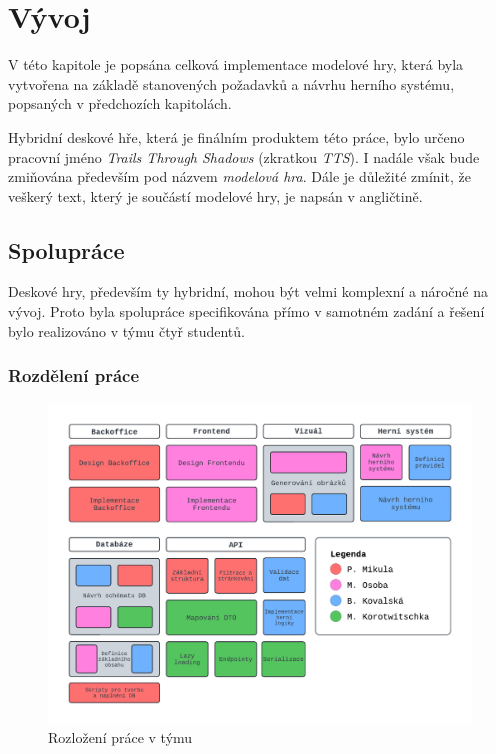 \chapter{Vývoj}
\label{chap:development}

V této kapitole je popsána celková implementace modelové hry, která byla vytvořena na základě stanovených požadavků a návrhu herního systému, popsaných v předchozích kapitolách.

Hybridní deskové hře, která je finálním produktem této práce, bylo určeno pracovní jméno \textit{Trails Through Shadows} (zkratkou \textit{TTS}). I nadále však bude zmiňována především pod názvem \textit{modelová hra}. Dále je důležité zmínit, že veškerý text, který je součástí modelové hry, je napsán v angličtině.

\section{Spolupráce}
\label{sec:collaboration}

Deskové hry, především ty hybridní, mohou být velmi komplexní a náročné na vývoj. Proto byla spolupráce specifikována přímo v samotném zadání a řešení bylo realizováno v týmu čtyř studentů.

\subsection{Rozdělení práce}
\label{subsec:job_distribution}

\begin{figure}[h]
    \centering
    \includegraphics[width=\textwidth]{../../shared/diagrams/blocks.pdf}
    \caption{Rozložení práce v týmu}
    \label{fig:job_distribution}
\end{figure}

